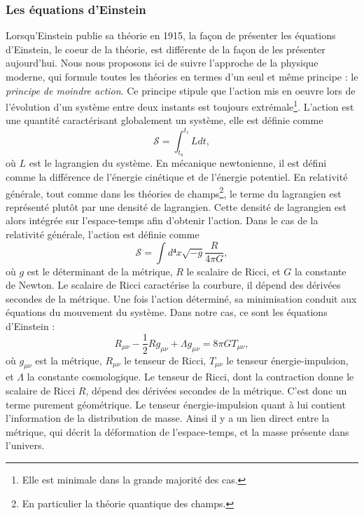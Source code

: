 \documentclass[11pt, twoside, a4paper, openright]{report}
\begin{document}
\subsubsection{Les équations d'Einstein}
Lorsqu'Einstein publie sa théorie en 1915, la façon de présenter les équations d'Einstein, le coeur de la théorie, est différente de la façon de les présenter aujourd'hui. Nous nous proposons ici de suivre l'approche de la physique moderne, qui formule toutes les théories en termes d'un seul et même principe : le \emph{principe de moindre action}. Ce principe stipule que l'action mis en oeuvre lors de l'évolution d'un système entre deux instants est toujours extrémale\footnote{Elle est minimale dans la grande majorité des cas.}. L'action est une quantité caractérisant globalement un système, elle est définie comme
\begin{equation}
  \label{eq:action}
  \mathcal{S} = \int_{t₀}^{t₁} L dt,
\end{equation}
où $L$ est le lagrangien du système. En mécanique newtonienne, il est défini comme la différence de l'énergie cinétique et de l'énergie potentiel. En relativité générale, tout comme dans les théories de champs\footnote{En particulier la théorie quantique des champs.}, le terme du lagrangien est représenté plutôt par une densité de lagrangien. Cette densité de lagrangien est alors intégrée sur l'espace-temps afin d'obtenir l'action. Dans le cas de la relativité générale, l'action est définie comme
\begin{equation}
  \label{eq:actionrg}
  \mathcal{S} = \int d⁴x \sqrt{-g} \frac{R}{4 \pi G} ,
\end{equation}
où $g$ est le déterminant de la métrique, $R$ le scalaire de Ricci, et $G$ la constante de Newton. Le scalaire de Ricci caractérise la courbure, il dépend des dérivées secondes de la métrique. Une fois l'action déterminé, sa minimisation conduit aux équations du mouvement du système. Dans notre cas, ce sont les équations d'Einstein :
\begin{equation}
  \label{eq:einstein}
  R_{\mu \nu} - \frac{1}{2} R g_{\mu \nu} + \Lambda g_{\mu \nu} = 8 \pi G T_{\mu \nu},
\end{equation}
où $g_{\mu \nu}$ est la métrique, $R_{\mu \nu}$ le tenseur de Ricci, $T_{\mu \nu}$ le tenseur énergie-impulsion, et $\Lambda$ la constante cosmologique. Le tenseur de Ricci, dont la contraction donne le scalaire de Ricci $R$, dépend des dérivées secondes de la métrique. C'est donc un terme purement géométrique. Le tenseur énergie-impulsion quant à lui contient l'information de la distribution de masse. Ainsi il y a un lien direct entre la métrique, qui décrit la déformation de l'espace-temps, et la masse présente dans l'univers.
\end{document}
